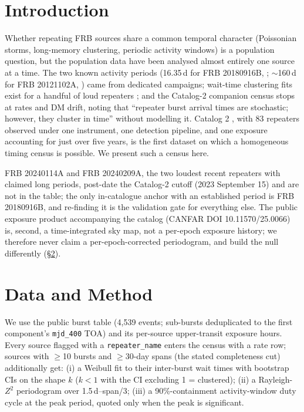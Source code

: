 \documentclass[twocolumn]{aastex631}
\newcommand{\code}[1]{\texttt{#1}}
\begin{document}
\section{Introduction}
Whether repeating FRB sources share a common temporal character (Poissonian storms,
long-memory clustering, periodic activity windows) is a population question, but the
population data have been analysed almost entirely one source at a time. The two known
activity periods (16.35\,d for FRB 20180916B, \citealt{chime2020period}; $\sim$160\,d for
FRB 20121102A, \citealt{rajwade2020}) came from dedicated campaigns; wait-time clustering fits exist for a handful of
loud repeaters \citep[e.g.][]{oppermann2018,frb220912a}; and the Catalog-2 companion census
\citep{cook2026} stops at rates and DM drift, noting that ``repeater burst arrival times are
stochastic; however, they cluster in time'' without modelling it. Catalog 2 \citep{cat2},
with 83 repeaters observed under one instrument, one detection pipeline, and one exposure
accounting for just over five years, is the first dataset on which a homogeneous timing census
is possible. We present such a census here.

FRB 20240114A and FRB 20240209A, the two loudest recent repeaters with claimed long periods,
post-date the Catalog-2 cutoff (2023 September 15) and are not in the table; the only
in-catalogue anchor with an established period is FRB 20180916B, and re-finding it is the
validation gate for everything else. The public exposure product accompanying the catalog
(CANFAR DOI 10.11570/25.0066) is, second, a time-integrated sky map, not a per-epoch exposure
history; we therefore never claim a per-epoch-corrected periodogram, and build the null
differently (\S\ref{sec:method}).

\section{Data and Method}
\label{sec:method}
We use the public burst table (4,539 events; sub-bursts deduplicated to the first component's
\code{mjd\_400} TOA) and its per-source upper-transit exposure hours. Every source flagged
with a \code{repeater\_name} enters the census with a rate row; sources with $\ge$10 bursts
and $\ge$30-day spans (the stated completeness cut) additionally get: (i) a Weibull fit to
their inter-burst wait times with bootstrap CIs on the shape $k$ ($k<1$ with the CI excluding
1 = clustered); (ii) a Rayleigh-$Z^2$ periodogram over 1.5\,d--span/3; (iii) a
90\%-containment activity-window duty cycle at the peak period, quoted only when the peak is
significant.
\end{document}
